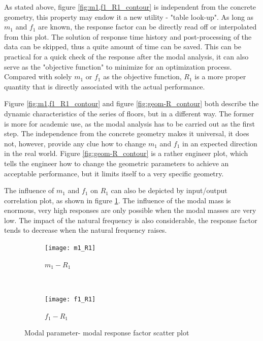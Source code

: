 As stated above, figure \ref{fig:m1,f1_R1_contour} is independent from the concrete geometry, this property may endow it a new utility - "table look-up". As long as $m_1$ and $f_1$ are known, the response factor can be directly read off or interpolated from this plot. The solution of response time history and post-processing of the data can be skipped, thus a quite amount of time can be saved. This can be practical for a quick check of the response after the modal analysis, it can also serve as the "objective function" to minimize for an optimization process. Compared with solely $m_1$ or $f_1$ as the objective function, $R_1$ is a more proper quantity that is directly associated with the actual performance. 

Figure \ref{fig:m1,f1_R1_contour} and figure \ref{fig:geom-R_contour} both describe the dynamic characteristics of the series of floors, but in a different way. The former is more for academic use, as the modal analysis has to be carried out as the first step. The independence from the concrete geometry makes it universal, it does not, however, provide any clue how to change $m_1$ and $f_1$ in an expected direction in the real world. Figure \ref{fig:geom-R_contour} is a rather engineer plot, which tells the engineer how to change the geometric parameters to achieve an acceptable performance, but it limits itself to a very specific geometry.

The influence of $m_1$ and $f_1$ on $R_1$ can also be depicted by input/output correlation plot, as shown in figure \ref{fig:m1,f1_R1_scatter}. The influence of the modal mass is enormous, very high responses are only possible when the modal masses are very low. The impact of the natural frequency is also considerable, the response factor tends to decrease when the natural frequency raises.

\begin{figure}[H]
\begin{subfigure}[b]{.49\textwidth}
  \centering
  \texttt{[image: m1\_R1]}
  \caption{$m_1-R_1$}
\end{subfigure}
~
\begin{subfigure}[b]{.49\textwidth}
  \centering
  \texttt{[image: f1\_R1]}
  \caption{$f_1-R_1$}
\end{subfigure}

\caption{Modal parameter- modal response factor scatter plot}
\label{fig:m1,f1_R1_scatter}
\end{figure}

